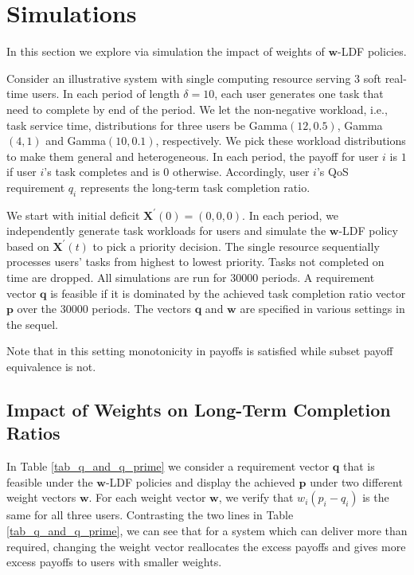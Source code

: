 \documentclass[prodmode,acmtompecs]{acmsmall}
\newcommand{\reqvec}{\mathbf{q}}
\newcommand{\reqscalar}{q}
\begin{document}
\section{Simulations}
\label{sec_simulations}
In this section we explore via simulation the impact of weights of $\mathbf{w}$-LDF policies. 

Consider an illustrative system with single computing resource serving $3$ soft real-time users. In each period of length $\delta = 10$, each user generates one task that need to complete by end of the period. We let the non-negative workload, i.e., task service time, distributions for three users be Gamma$(12, 0.5)$, Gamma$(4, 1)$ and Gamma$(10, 0.1)$, respectively. We pick these workload distributions to make them general and heterogeneous. 
In each period, the payoff for user $i$ is $1$ if user $i$'s task completes and is $0$ otherwise. Accordingly, user $i$'s QoS requirement $\reqscalar_i$ represents the long-term task completion ratio. 

We start with initial deficit $\mathbf{X}^\prime(0) = (0, 0, 0)$. In each period, we independently generate task workloads for users and simulate the $\mathbf{w}$-LDF policy based on $\mathbf{X}^\prime(t)$ to pick a priority decision. The single resource sequentially processes users' tasks from highest to lowest priority. 
Tasks not completed on time are dropped. 
All simulations are run for $30000$ periods.  
A requirement vector $\reqvec$ is feasible if it is dominated by the achieved task completion ratio vector $\mathbf{p}$ over the $30000$ periods. The vectors $\reqvec$ and $\mathbf{w}$ are specified in various settings in the sequel. 

Note that in this setting monotonicity in payoffs is satisfied while subset payoff equivalence is not. 

\subsection{Impact of Weights on Long-Term Completion Ratios}
\label{subsection_effect_weights_long_term}

In Table \ref{tab_q_and_q_prime} we consider a requirement vector $\reqvec$ that is feasible under the $\mathbf{w}$-LDF policies and display the achieved 
$\mathbf{p}$ under two different weight vectors $\mathbf{w}$. For each weight vector $\mathbf{w}$, we verify that $w_i(p_i - \reqscalar_i)$ is the same for all three users. 
Contrasting the two lines in Table \ref{tab_q_and_q_prime}, we can see that for a system which can deliver more than required, changing the weight vector reallocates the excess payoffs and gives more excess payoffs to users with smaller weights. 
\end{document}
